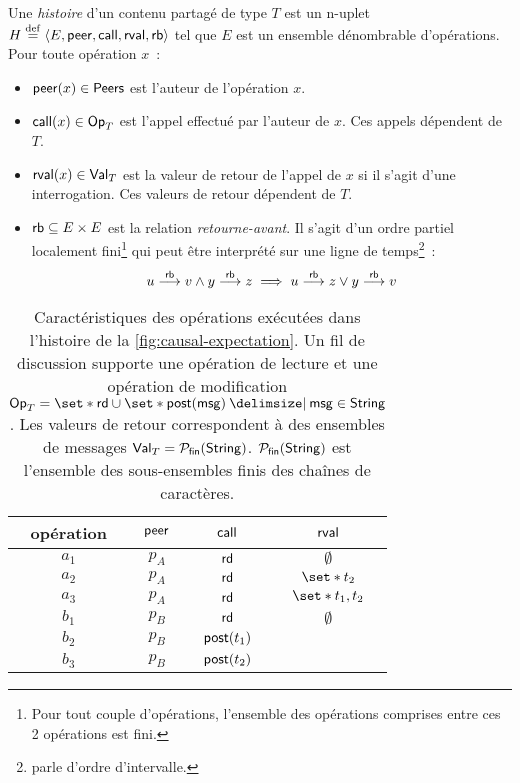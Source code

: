 \begin{definition}\label{def:history}
Une \emph{histoire} d'un contenu partagé de type $T$ est un n-uplet $H \defeq \tuple*{E, \trm{peer}, \trm{call}, \trm{rval}, \trm{rb}}$ tel que $E$ est un ensemble dénombrable d'opérations.
Pour toute opération $x$~:
\begin{itemize}
\item $\trm{peer}(x) \in \trm{Peers}$ est l'auteur de l'opération $x$.
\item $\trm{call}(x) \in \trm{Op}_T$ est l'appel effectué par l'auteur de $x$.
Ces appels dépendent de $T$.
\item $\trm{rval}(x) \in \trm{Val}_T$ est la valeur de retour de l'appel de $x$ si il s'agit d'une interrogation.
Ces valeurs de retour dépendent de $T$.
\end{itemize}
\begin{itemize}[leftmargin=*]
\item[] $\trm{rb} \subseteq E \times E$ est la relation \emph{retourne-avant}.
Il s'agit d'un ordre partiel localement fini\footnote{Pour tout couple d'opérations, l'ensemble des opérations comprises entre ces 2 opérations est fini.} qui peut être interprété sur une ligne de temps\footnote{\textcite{greenough_1976_semiorder} parle d'ordre d'intervalle.}~:
\begin{equation*}
    u \rb v \land y \rb z \implies u \rb z \lor y \rb v
\end{equation*}
\end{itemize}
\end{definition}

\begin{table}[ht]
    \centering
    \begin{tabular}{cccc}
        opération & $\trm{peer}$ & $\trm{call}$ & $\trm{rval}$ \\
        \toprule
        $a_1$ & $p_A$ & $\trm{rd}$ & $\emptyset$ \\
        $a_2$ & $p_A$ & $\trm{rd}$ & $\set*{t_2}$ \\
        $a_3$ & $p_A$ & $\trm{rd}$ & $\set*{t_1, t_2}$ \\
        $b_1$ & $p_B$ & $\trm{rd}$ & $\emptyset$ \\
        $b_2$ & $p_B$ & $\trm{post}(t_1)$ & \\
        $b_3$ & $p_B$ & $\trm{post}(t_2)$ & \\
    \end{tabular}
    \caption{Caractéristiques des opérations exécutées dans l'histoire de la \autoref{fig:causal-expectation}.
    Un fil de discussion supporte une opération de lecture et une opération de modification $\trm{Op}_T = \set*{\trm{rd}} \cup \set*{\trm{post}(\trm{msg}) \given \trm{msg} \in \trm{String}}$.
    Les valeurs de retour correspondent à des ensembles de messages $\trm{Val}_T = \powerfset{\trm{String}}$. $\powerfset{\trm{String}}$ est l'ensemble des sous-ensembles finis des chaînes de caractères.}\label{tab:op-attributes}
\end{table}

